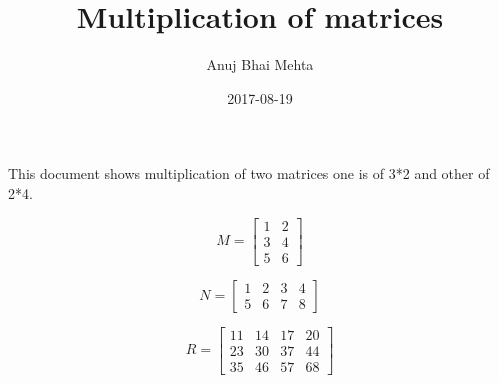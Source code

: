 \documentclass{article}
\title{Multiplication of matrices}
\date{2017-08-19}
\author{Anuj Bhai Mehta}
\begin{document}
This document shows multiplication of two matrices one is of 3*2 and other of 2*4.
\newline

\[
M=
  \begin{bmatrix}
    1 & 2 \\
    3 & 4 \\
    5 & 6

  \end{bmatrix}
\]

\[
N=
  \begin{bmatrix}
    1 & 2 & 3 & 4 \\
    5 & 6 & 7 & 8 

  \end{bmatrix}
\]

\[
R=
  \begin{bmatrix}
    11 & 14 & 17 & 20 \\
    23 & 30 & 37 & 44 \\
    35 & 46 & 57 & 68

  \end{bmatrix}
\]
\end{document}
